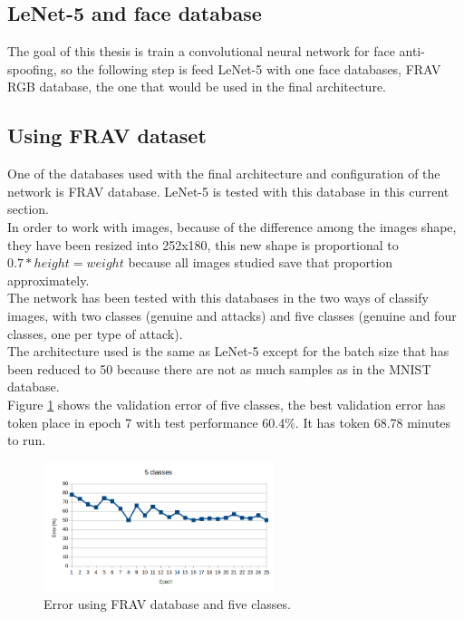 \subsection{LeNet-5 and face database}
The goal of this thesis is train a convolutional neural network for face anti-spoofing, so the following step is feed LeNet-5 with one face databases, FRAV RGB database, the one that would be used in the final architecture.\\

\subsection{Using FRAV dataset}
One of the databases used with the final architecture and configuration of the network is FRAV database. LeNet-5 is tested with this database in this current section.\\

In order to work with images, because of the difference among the images shape, they have been resized into 252x180, this new shape is proportional to $0.7*height = weight$ because all images studied save that proportion approximately.\\

The network has been tested with this databases in the two ways of classify images, with two classes (genuine and attacks) and five classes (genuine and four classes, one per type of attack).\\ %

The architecture used is the same as LeNet-5 except for the batch size that has been reduced to 50 because there are not as much samples as in the MNIST database.\\


Figure \ref{fig:FRAV_five} shows the validation error of five classes, the best validation error has token place in epoch 7 with test performance 60.4\%. It has token 68.78 minutes to run.\\

\begin{figure}[htb]
\centering
\includegraphics[width=0.6\textwidth]{images/epoch_5classes_FRAV_1.png}
\caption{Error using FRAV database and five classes.}
\label{fig:FRAV_five}
\end{figure}

